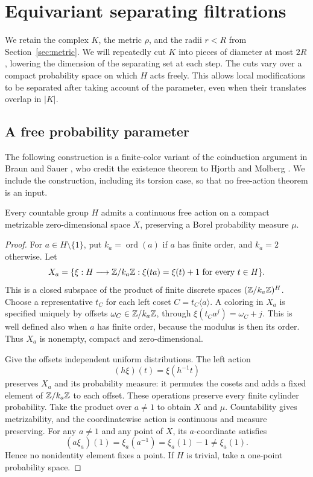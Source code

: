 \section{Equivariant separating filtrations}\label{sec:filtrations}

We retain the complex $K$, the metric $\rho$, and the radii $r<R$
from Section~\ref{sec:metric}.  We will repeatedly cut $K$ into pieces of
diameter at most $2R$, lowering the dimension of the separating set at
each step.  The cuts vary over a compact probability space on which $H$
acts freely.  This allows local modifications to be separated after
taking account of the parameter, even when their translates overlap in
$|K|$.

\subsection{A free probability parameter}

The following construction is a finite-color variant of the coinduction
argument in Braun and Sauer \cite[Theorem 2.1]{BraunSauer2021}, who credit
the existence theorem to Hjorth and Molberg \cite[Theorem 0.1]{HjorthMolberg2006}.
We include the construction,
including its torsion case, so that no free-action theorem is an input.

\begin{lemma}\label{lem:free-parameter}
Every countable group $H$ admits a continuous free action on a compact
metrizable zero-dimensional space $X$, preserving a Borel probability
measure $\mu$.
\end{lemma}

\begin{proof}
For $a\in H\setminus\{1\}$, put $k_a=\operatorname{ord}(a)$ if $a$ has
finite order, and $k_a=2$ otherwise.  Let
\[
 X_a=\{\xi:H\longrightarrow\mathbb Z/k_a\mathbb Z:
                 \xi(ta)=\xi(t)+1\text{ for every }t\in H\}.
\]
This is a closed subspace of the product of finite discrete spaces
$(\mathbb Z/k_a\mathbb Z)^H$.  Choose a representative $t_C$ for each left coset
$C=t_C\langle a\rangle$.  A coloring in $X_a$ is specified uniquely by
offsets $\omega_C\in\mathbb Z/k_a\mathbb Z$, through
$\xi(t_Ca^j)=\omega_C+j$.  This is well defined also when $a$ has finite
order, because the modulus is then its order.  Thus $X_a$ is nonempty,
compact and zero-dimensional.

Give the offsets independent uniform distributions.  The left action
\[
 (h\xi)(t)=\xi(h^{-1}t)
\]
preserves $X_a$ and its probability measure: it permutes the cosets and
adds a fixed element of $\mathbb Z/k_a\mathbb Z$ to each offset.  These operations
preserve every finite cylinder probability.  Take the product over
$a\ne1$ to obtain $X$ and $\mu$.  Countability gives metrizability, and
the coordinatewise action is continuous and measure preserving.
For any $a\ne1$ and any point of $X$, its $a$-coordinate satisfies
\[
 (a\xi_a)(1)=\xi_a(a^{-1})=\xi_a(1)-1\ne\xi_a(1).
\]
Hence no nonidentity element fixes a point.  If $H$ is trivial, take a
one-point probability space.
\end{proof}

